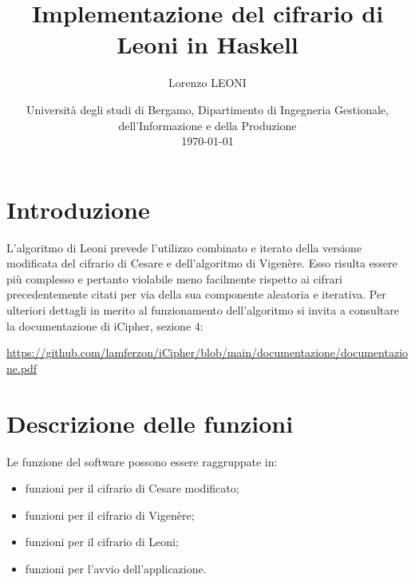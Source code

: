 \documentclass[a4paper, 12pt, one column, aas_macros]{article}
\title{Implementazione del cifrario di Leoni in Haskell}
\author{Lorenzo LEONI}
\date{%
	Università degli studi di Bergamo, Dipartimento di Ingegneria Gestionale, dell'Informazione e della Produzione\\[2ex]%
	\today
}
\begin{document}
	\maketitle
	\section{Introduzione}
	L'algoritmo di Leoni prevede l'utilizzo combinato e iterato della versione modificata del cifrario di Cesare  e dell'algoritmo di Vigenère. Esso risulta essere più complesso e pertanto violabile meno facilmente rispetto ai cifrari precedentemente citati per via della sua componente aleatoria e iterativa. Per ulteriori dettagli in merito al funzionamento dell'algoritmo si invita a consultare la documentazione di iCipher, sezione \num{4}:
	\begin{center}
		\url{https://github.com/lamferzon/iCipher/blob/main/documentazione/documentazione.pdf}
	\end{center}
	
	\section{Descrizione delle funzioni}
	Le funzione del software possono essere raggruppate in:
	\begin{itemize}
		\item funzioni per il cifrario di Cesare modificato;
		\item funzioni per il cifrario di Vigenère;
		\item funzioni per il cifrario di Leoni;
		\item funzioni per l'avvio dell'applicazione.
	\end{itemize}
\end{document}
